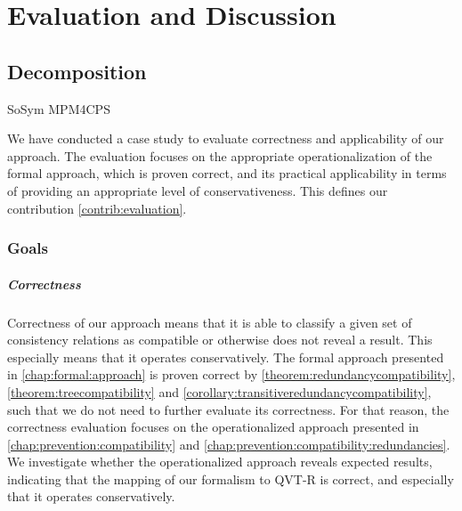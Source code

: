 \chapter{Evaluation and Discussion 
}
\label{chap:correctness_evaluation}


\section{Decomposition}
\begin{copiedFrom}{SoSym MPM4CPS}

We have conducted a case study to evaluate correctness and applicability of our approach.
The evaluation focuses on the appropriate operationalization of the formal approach, which is proven correct, and its practical applicability in terms of providing an appropriate level of conservativeness. This defines our contribution \ref{contrib:evaluation}.



\subsection{Goals}

\paragraph{Correctness}
Correctness of our approach means that it is able to classify a given set of consistency relations as compatible or otherwise does not reveal a result.
This especially means that it operates conservatively.
The formal approach presented in \autoref{chap:formal:approach} is proven correct by \autoref{theorem:redundancycompatibility}, \autoref{theorem:treecompatibility} and \autoref{corollary:transitiveredundancycompatibility}, such that we do not need to further evaluate its correctness.
For that reason, the correctness evaluation focuses on the operationalized approach presented in \autoref{chap:prevention:compatibility} and \autoref{chap:prevention:compatibility:redundancies}.
We investigate whether the operationalized approach reveals expected results, indicating that the mapping of our formalism to QVT-R is correct, and especially that it operates conservatively.


\end{copiedFrom}
